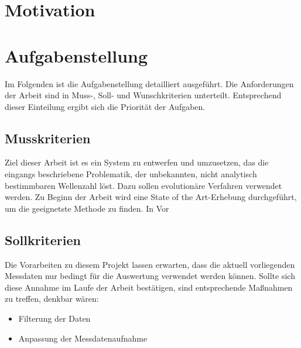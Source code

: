 \documentclass[a4paper,12pt,fleqn]{article}
\begin{document}

\setlength{\headheight}{36pt}

\begin{titlepage}



\end{titlepage}

\begin{abstract}

\end{abstract}

\tableofcontents
\newpage

\section{Motivation}


\section{Aufgabenstellung}
Im Folgenden ist die Aufgabenstellung detailliert ausgeführt. Die Anforderungen der Arbeit sind in Muss-, Soll- und Wunschkriterien unterteilt. Entsprechend dieser Einteilung ergibt sich die Priorität der Aufgaben.

\subsection{Musskriterien}
Ziel dieser Arbeit ist es ein System zu entwerfen und umzusetzen, das die eingangs beschriebene Problematik, der unbekannten, nicht analytisch bestimmbaren Wellenzahl löst. Dazu sollen evolutionäre Verfahren verwendet werden. Zu Beginn der Arbeit wird eine State of the Art-Erhebung durchgeführt, um die geeignetste Methode zu finden. In Vor

\subsection{Sollkriterien}
Die Vorarbeiten zu diesem Projekt lassen erwarten, dass die aktuell vorliegenden Messdaten nur bedingt für die Auswertung verwendet werden können. Sollte sich diese Annahme im Laufe der Arbeit bestätigen, sind entsprechende Maßnahmen zu treffen, denkbar wären:
\begin{itemize}
\item Filterung der Daten
\item Anpassung der Messdatenaufnahme
\end{itemize}
\end{document}
